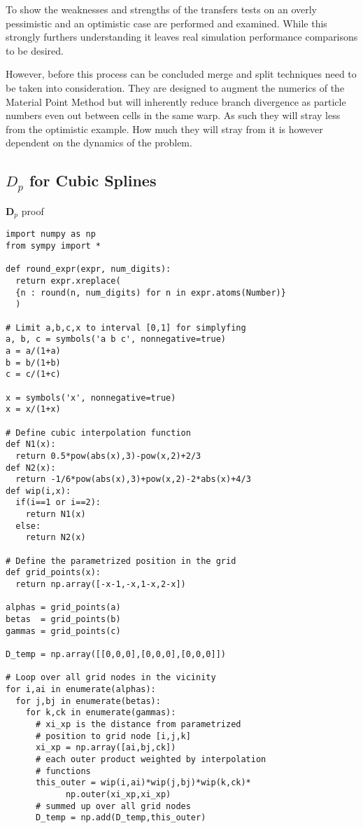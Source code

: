 \documentclass[m,times]{cgMA}
\begin{document}
To show the weaknesses and strengths of the transfers tests on an overly pessimistic and an optimistic case are performed and examined. While this strongly furthers understanding it leaves real simulation performance comparisons to be desired.

However, before this process can be concluded merge and split techniques need to be taken into consideration. They are designed to augment the numerics of the Material Point Method but will inherently reduce branch divergence as particle numbers even out between cells in the same warp. As such they will stray less from the optimistic example. How much they will stray from it is however dependent on the dynamics of the problem.
\clearpage
\begin{appendices}
\section{$D_p$ for Cubic Splines}\label{app:dp_proof}
  \begin{code}
\caption{$\boldsymbol{D}_p$ proof}
  \begin{verbatim}
import numpy as np
from sympy import *

def round_expr(expr, num_digits):
  return expr.xreplace(
  {n : round(n, num_digits) for n in expr.atoms(Number)}
  )

# Limit a,b,c,x to interval [0,1] for simplyfing
a, b, c = symbols('a b c', nonnegative=true)
a = a/(1+a)
b = b/(1+b)
c = c/(1+c)

x = symbols('x', nonnegative=true)
x = x/(1+x)

# Define cubic interpolation function
def N1(x):
  return 0.5*pow(abs(x),3)-pow(x,2)+2/3
def N2(x):
  return -1/6*pow(abs(x),3)+pow(x,2)-2*abs(x)+4/3
def wip(i,x):
  if(i==1 or i==2):
    return N1(x)
  else:
    return N2(x)

# Define the parametrized position in the grid
def grid_points(x):
  return np.array([-x-1,-x,1-x,2-x])

alphas = grid_points(a)
betas  = grid_points(b)
gammas = grid_points(c)

D_temp = np.array([[0,0,0],[0,0,0],[0,0,0]])

# Loop over all grid nodes in the vicinity
for i,ai in enumerate(alphas):
  for j,bj in enumerate(betas):
    for k,ck in enumerate(gammas):
      # xi_xp is the distance from parametrized
      # position to grid node [i,j,k]
      xi_xp = np.array([ai,bj,ck])
      # each outer product weighted by interpolation
      # functions
      this_outer = wip(i,ai)*wip(j,bj)*wip(k,ck)*
		    np.outer(xi_xp,xi_xp)
      # summed up over all grid nodes
      D_temp = np.add(D_temp,this_outer)


\end{verbatim}
\end{code}
\end{appendices}
\end{document}
